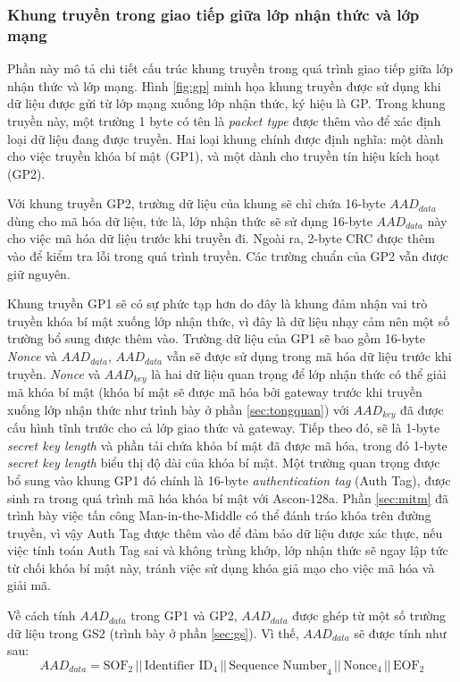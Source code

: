 \subsubsection{Khung truyền trong giao tiếp giữa lớp nhận thức và lớp mạng}
Phần này mô tả chi tiết cấu trúc khung truyền trong quá trình giao tiếp giữa lớp nhận thức và lớp mạng. Hình \ref{fig:gp} minh họa khung truyền được sử dụng khi dữ liệu được gửi từ lớp mạng xuống lớp nhận thức, ký hiệu là GP. Trong khung truyền này, một trường 1 byte có tên là \textit{packet type} được thêm vào để xác định loại dữ liệu đang được truyền. Hai loại khung chính được định nghĩa: một dành cho việc truyền khóa bí mật (GP1), và một dành cho truyền tín hiệu kích hoạt (GP2). 

Với khung truyền GP2, trường dữ liệu của khung sẽ chỉ chứa 16-byte $AAD_{data}$ dùng cho mã hóa dữ liệu, tức là, lớp nhận thức sẽ sử dụng 16-byte $AAD_{data}$ này cho việc mã hóa dữ liệu trước khi truyền đi. Ngoài ra, 2-byte CRC được thêm vào để kiểm tra lỗi trong quá trình truyền. Các trường chuẩn của GP2 vẫn được giữ nguyên.

Khung truyền GP1 sẽ có sự phức tạp hơn do đây là khung đảm nhận vai trò truyền khóa bí mật xuống lớp nhận thức, vì đây là dữ liệu nhạy cảm nên một số trường bổ sung được thêm vào. Trường dữ liệu của GP1 sẽ bao gồm 16-byte \textit{Nonce} và $AAD_{data}$, $AAD_{data}$ vẫn sẽ được sử dụng trong mã hóa dữ liệu trước khi truyền. \textit{Nonce} và $AAD_{key}$ là hai dữ liệu quan trọng để lớp nhận thức có thể giải mã khóa bí mật (khóa bí mật sẽ được mã hóa bởi gateway trước khi truyền xuống lớp nhận thức như trình bày ở phần \ref{sec:tongquan}) với $AAD_{key}$ đã được cấu hình tĩnh trước cho cả lớp giao thức và gateway. Tiếp theo đó, sẽ là 1-byte \textit{secret key length} và phần tải chứa khóa bí mật đã được mã hóa, trong đó 1-byte \textit{secret key length} biểu thị độ dài của khóa bí mật. Một trường quan trọng được bổ sung vào khung GP1 đó chính là 16-byte \textit{authentication tag} (Auth Tag), được sinh ra trong quá trình mã hóa khóa bí mật với Ascon-128a. Phần \ref{sec:mitm} đã trình bày việc tấn công Man-in-the-Middle có thể đánh tráo khóa trên đường truyền, vì vậy Auth Tag được thêm vào để đảm bảo dữ liệu được xác thực, nếu việc tính toán Auth Tag sai và không trùng khớp, lớp nhận thức sẽ ngay lập tức từ chối khóa bí mật này, tránh việc sử dụng khóa giả mạo cho việc mã hóa và giải mã.

Về cách tính $AAD_{data}$ trong GP1 và GP2, $AAD_{data}$ được ghép từ một số trường dữ liệu trong GS2 (trình bày ở phần \ref{sec:gs}). Vì thế, $AAD_{data}$ sẽ được tính như sau:
\[
\text{$AAD_{data}$} = \text{SOF}_{2} \, || \, \text{Identifier ID}_{4} \, || \, \text{Sequence Number}_{4} \, || \, \text{Nonce}_{4} \, || \, \text{EOF}_{2}
\]

